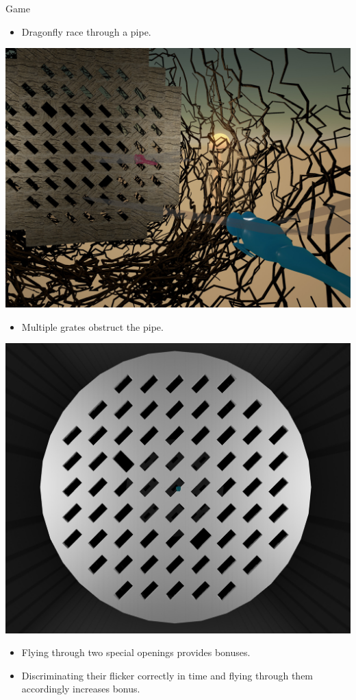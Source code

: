 \documentclass[a0paper,portrait]{baposter}
\begin{document}
\begin{poster}
\begin{posterbox}[name=game,span=1,column=1,row=1,below=intro]{Game}
\begin{itemize}
\item Dragonfly race through a pipe.
\end{itemize}
\includegraphics[width=1\textwidth]{game.jpg}
\begin{itemize}
\item Multiple grates obstruct the pipe.
\end{itemize}
\includegraphics[width=1 \textwidth]{grate.jpg}
\begin{itemize}
\item Flying through two special openings provides bonuses.
\end{itemize}
\begin{itemize}
\item Discriminating their flicker correctly in time and flying through them accordingly increases bonus.
\end{itemize}
\end{posterbox}


\end{poster}
\end{document}
